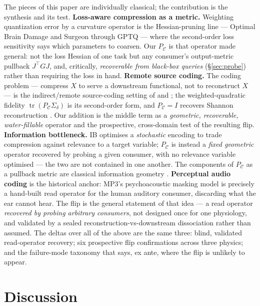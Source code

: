 \documentclass[11pt]{article}
\theoremstyle{remark}
\newcommand{\PC}{P_{\mathcal{C}}}
\newcommand{\Sd}{\Sigma_{\delta}}
\newcommand{\tr}{\operatorname{tr}}
\begin{document}
The pieces of this paper are individually classical; the contribution is the synthesis and
its test. \textbf{Loss-aware compression as a metric.} Weighting quantization error by a
curvature operator is the Hessian-pruning line --- Optimal Brain Damage and Surgeon
\citep{lecun1990obd,hassibi1993obs} through GPTQ \citep{frantar2023gptq} --- where the
second-order loss sensitivity says which parameters to coarsen. Our $\PC$ is that operator
made general: not the loss Hessian of one task but any consumer's output-metric pullback
$J^\top G J$, and, critically, \emph{recoverable from black-box queries} (\S\ref{sec:probe})
rather than requiring the loss in hand. \textbf{Remote source coding.} The coding problem
--- compress $X$ to serve a downstream functional, not to reconstruct $X$ --- is the
indirect/remote source-coding setting of \citet{dobrushin1962} and \citet{wolfziv1970};
the weighted-quadratic fidelity $\tr(\PC\Sd)$ is its second-order form, and $\PC=I$ recovers
Shannon reconstruction \citep{shannon1959,cover2006}. Our addition is the middle term as a
\emph{geometric, recoverable, water-fillable} operator and the prospective, cross-domain
test of the resulting flip. \textbf{Information bottleneck.} IB \citep{tishby1999ib}
optimises a \emph{stochastic} encoding to trade compression against relevance to a target
variable; $\PC$ is instead a \emph{fixed geometric} operator recovered by probing a given
consumer, with no relevance variable optimised --- the two are not contained in one another.
The components of $\PC$ as a pullback metric are classical information geometry
\citep{amari2000}. \textbf{Perceptual audio coding} is the historical anchor: MP3's
psychoacoustic masking model \citep{painter2000perceptual} is precisely a hand-built read
operator for the human auditory consumer, discarding what the ear cannot hear. The flip is
the general statement of that idea --- a read operator \emph{recovered by probing arbitrary
consumers}, not designed once for one physiology, and validated by a sealed
reconstruction-vs-downstream dissociation rather than assumed. The deltas over all of the
above are the same three: blind, validated read-operator recovery; six prospective flip
confirmations across three physics; and the failure-mode taxonomy that says, ex ante, where
the flip is unlikely to appear.

\section{Discussion}\label{sec:discussion}
\end{document}
